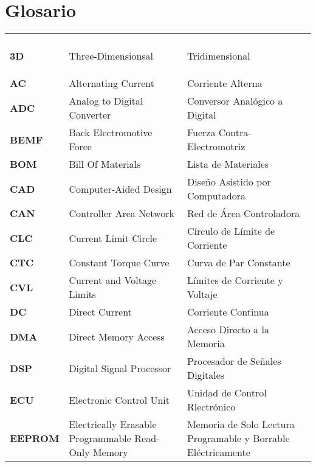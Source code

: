 \chapter*{Glosario}

\begin{longtable}{>{\bfseries}p{3cm} p{5cm} p{5cm}}
	\endfirsthead
	\multicolumn{3}{c}{ } \\
	\endfoot
	\endlastfoot

\textbf{3D} & Three-Dimensionsal & Tridimensional \\

\textbf{AC} & Alternating Current & Corriente Alterna \\

\textbf{ADC} & Analog to Digital Converter & Conversor Analógico a Digital \\

\textbf{BEMF} & Back Electromotive Force & Fuerza Contra-Electromotriz \\

\textbf{BOM} & Bill Of Materials & Lista de Materiales \\

\textbf{CAD} & Computer-Aided Design & Diseño Asistido por Computadora \\

\textbf{CAN} & Controller Area Network & Red de Área Controladora \\

\textbf{CLC} & Current Limit Circle & Círculo de Límite de Corriente \\

\textbf{CTC} & Constant Torque Curve & Curva de Par Constante \\

\textbf{CVL} & Current and Voltage Limits & Límites de Corriente y Voltaje \\

\textbf{DC} & Direct Current & Corriente Continua \\

\textbf{DMA} & Direct Memory Access & Acceso Directo a la Memoria \\

\textbf{DSP} & Digital Signal Processor & Procesador de Señales Digitales \\

\textbf{ECU} & Electronic Control Unit & Unidad de Control Rlectrónico \\

\textbf{EEPROM} & Electrically Erasable Programmable Read-Only Memory & Memoria de Solo Lectura Programable y Borrable Eléctricamente \\


\end{longtable}
